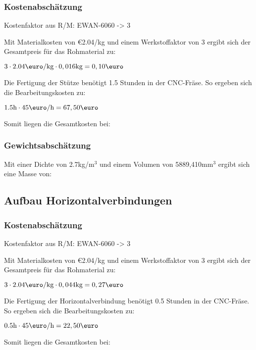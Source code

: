 \documentclass[10pt, a4paper]{article}
\begin{document}
\subsubsection{Kostenabschätzung}
\begin{center}
  Kostenfaktor aus R/M: EWAN-6060 -> 3
\end{center}
Mit Materialkosten von \euro2.04/kg und einem Werkstoffaktor von 3 ergibt sich der Gesamtpreis für das Rohmaterial zu: 
\begin{center}
    $3 \cdot 2.04\text{\euro/kg} \cdot 0,016\text{kg} = 0,10\text{\euro}$
\end{center}
Die Fertigung der Stütze benötigt 1.5 Stunden in der CNC-Fräse. So ergeben sich die Bearbeitungskosten zu:
\begin{center}
  $1.5\text{h} \cdot 45\text{\euro/h}= 67,50\text{\euro}$
\end{center}
Somit liegen die Gesamtkosten bei:
\begin{flushright}
\end{flushright}
\subsubsection{Gewichtsabschätzung}
Mit einer Dichte von 2.7kg/m$^3$ und einem Volumen von 5889,410mm$^3$ ergibt sich eine Masse von:
\begin{flushright}
\end{flushright}

\newpage
\subsection{Aufbau Horizontalverbindungen}
\begin{figure}[h]
  \centering
  \vspace{-10pt}
\end{figure}
\subsubsection{Kostenabschätzung}
\begin{center}
  Kostenfaktor aus R/M: EWAN-6060 -> 3
\end{center}
Mit Materialkosten von \euro2.04/kg und einem Werkstoffaktor von 3 ergibt sich der Gesamtpreis für das Rohmaterial zu: 
\begin{center}
    $3 \cdot 2.04\text{\euro/kg} \cdot 0,044\text{kg} = 0,27\text{\euro}$
\end{center}
Die Fertigung der Horizontalverbindung benötigt 0.5 Stunden in der CNC-Fräse. So ergeben sich die Bearbeitungskosten zu:
\begin{center}
  $0.5\text{h} \cdot 45\text{\euro/h}= 22,50\text{\euro}$
\end{center}
Somit liegen die Gesamtkosten bei:
\begin{flushright}
\end{flushright}
\end{document}
